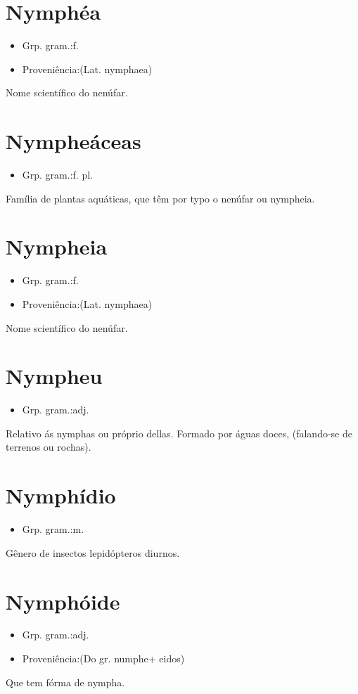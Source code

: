 \section{Nymphéa}
\begin{itemize}
\item {Grp. gram.:f.}
\end{itemize}
\begin{itemize}
\item {Proveniência:(Lat. \textunderscore nymphaea\textunderscore )}
\end{itemize}
Nome scientífico do nenúfar.
\section{Nympheáceas}
\begin{itemize}
\item {Grp. gram.:f. pl.}
\end{itemize}
Família de plantas aquáticas, que têm por typo o nenúfar ou nympheia.
\section{Nympheia}
\begin{itemize}
\item {Grp. gram.:f.}
\end{itemize}
\begin{itemize}
\item {Proveniência:(Lat. \textunderscore nymphaea\textunderscore )}
\end{itemize}
Nome scientífico do nenúfar.
\section{Nympheu}
\begin{itemize}
\item {Grp. gram.:adj.}
\end{itemize}
Relativo ás nymphas ou próprio dellas.
Formado por águas doces, (falando-se de terrenos ou rochas).
\section{Nymphídio}
\begin{itemize}
\item {Grp. gram.:m.}
\end{itemize}
Gênero de insectos lepidópteros diurnos.
\section{Nymphóide}
\begin{itemize}
\item {Grp. gram.:adj.}
\end{itemize}
\begin{itemize}
\item {Proveniência:(Do gr. \textunderscore numphe\textunderscore  + \textunderscore eidos\textunderscore )}
\end{itemize}
Que tem fórma de nympha.
